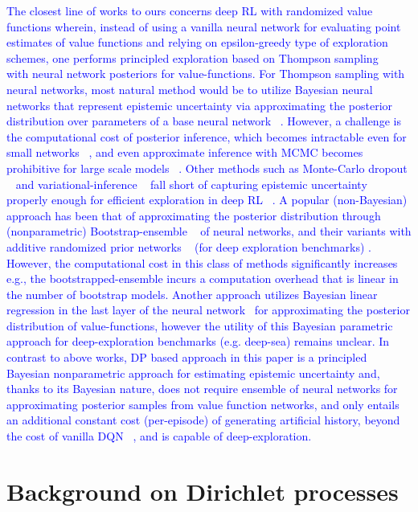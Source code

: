 \documentclass[10pt]{article}
\begin{document}
\textcolor{blue}{The closest line of works to ours concerns deep RL with randomized value functions wherein, instead of using a vanilla neural network for evaluating point estimates of value functions and relying on epsilon-greedy type of exploration schemes, one performs principled exploration based on Thompson sampling ~\citep{thompson1933likelihood} with neural network posteriors for value-functions. For Thompson sampling with neural networks,  most natural method would be to utilize Bayesian neural networks that represent epistemic uncertainty via approximating the posterior
distribution over parameters of a base neural network ~\citep{neal2012bayesian}. However, a challenge is the computational cost of posterior inference, which becomes intractable even for small networks ~\citep{mackay2003information}, and even approximate inference with 
MCMC becomes prohibitive for large scale models ~\citep{welling2011bayesian}. Other methods such as Monte-Carlo dropout ~\citep{gal2016dropout} and variational-inference ~\citep{blundell2015weight} fall short of capturing epistemic uncertainty properly enough for efficient exploration in deep RL ~\citep{osband2018randomized}. A popular (non-Bayesian) approach  has been that of  approximating the posterior distribution through (nonparametric) Bootstrap-ensemble ~\citep{osband2016deep} of neural networks,  and their variants with additive randomized prior networks ~\citep{osband2018randomized} (for deep exploration benchmarks) .  However, the computational cost in this class of methods  significantly increases e.g., the bootstrapped-ensemble incurs a computation overhead that is linear in the number of bootstrap models.  Another approach utilizes Bayesian linear regression in the last layer of the neural network~\citep{azizzadenesheli2018efficient} for approximating the posterior distribution of value-functions, however the utility of this Bayesian parametric approach for deep-exploration benchmarks (e.g. deep-sea) remains unclear.  In contrast to above works, DP based approach in this paper is a principled Bayesian nonparametric approach  for estimating epistemic uncertainty and, thanks to its Bayesian nature,  does not require ensemble of neural networks for approximating posterior samples from value function networks, and only entails an additional constant cost (per-episode) of generating artificial history, beyond the cost of vanilla DQN ~\citep{mnih2015human}, and is capable of deep-exploration. }



\section{Background on Dirichlet processes}
\label{sec:Background-DP}
\end{document}
